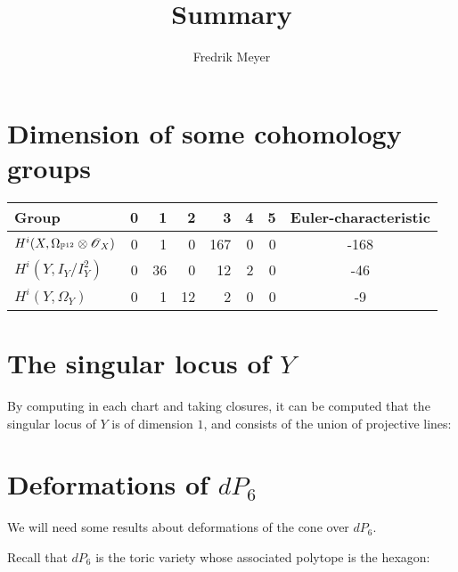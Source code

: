 \documentclass[11pt, english]{article}
\begin{document}
\title{Summary}
\author{Fredrik Meyer}
\maketitle 

\section{Dimension of some cohomology groups}

\begin{tabular}{ l || c | r | r | r | r | r | c  }
 Group & 0 & 1 & 2 & 3 & 4 & 5 & Euler-characteristic \\
\hline
$H^i(X, \Omega_{\mathbb{P}^{12}} \otimes \operatorname{\mathscr{O}}_X)$ & 0 & 1 & 0 & 167 & 0 & 0 & -168\\
$H^i(Y, I_Y/I_Y^2)$ & 0 & 36 & 0 & 12 & 2 & 0 & -46 \\
$H^i(Y, \Omega_Y)$ & 0 & 1  & 12 & 2 & 0  & 0 & -9
\end{tabular}


\section{The singular locus of $Y$}

By computing in each chart and taking closures, it can be computed that the singular locus of $Y$ is of dimension $1$, and consists of the union of projective lines:

\section{Deformations of $dP_6$}

We will need some results about deformations of the cone over $dP_6$. 

Recall that $dP_6$ is the toric variety whose associated polytope is the hexagon:

\begin{center}
\end{center}
\end{document}
